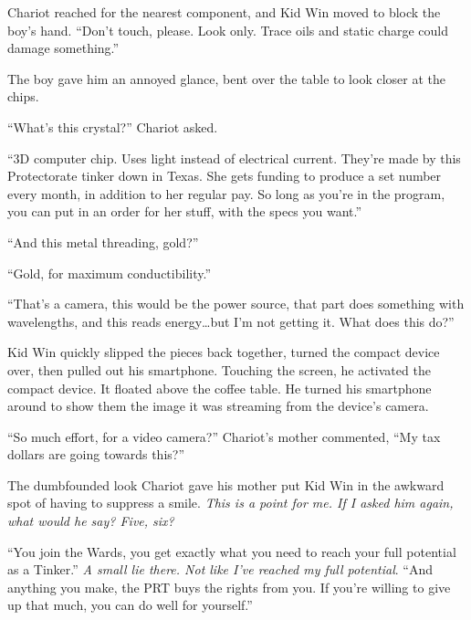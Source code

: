 Chariot reached for the nearest component, and Kid Win moved to block the boy's hand.  ``Don't touch, please.  Look only.  Trace oils and static charge could damage something.''



The boy gave him an annoyed glance, bent over the table to look closer at the chips.



``What's this crystal?''  Chariot asked.



``3D computer chip.  Uses light instead of electrical current.  They're made by this Protectorate tinker down in Texas.  She gets funding to produce a set number every month, in addition to her regular pay.  So long as you're in the program, you can put in an order for her stuff, with the specs you want.''



``And this metal threading, gold?''



``Gold, for maximum conductibility.''



``That's a camera, this would be the power source, that part does something with wavelengths, and this reads energy\ldots but I'm not getting it.  What does this do?''



Kid Win quickly slipped the pieces back together, turned the compact device over, then pulled out his smartphone.  Touching the screen, he activated the compact device.  It floated above the coffee table.  He turned his smartphone around to show them the image it was streaming from the device's camera.



``So much effort, for a video camera?'' Chariot's mother commented, ``My tax dollars are going towards this?''



The dumbfounded look Chariot gave his mother put Kid Win in the awkward spot of having to suppress a smile.  \emph{This is a point for me.  If I asked him again, what would he say?  Five, six?}



``You join the Wards, you get exactly what you need to reach your full potential as a Tinker.''  \emph{A small lie there.  Not like I've reached my full potential}.  ``And anything you make, the PRT buys the rights from you.  If you're willing to give up that much, you can do well for yourself.''



